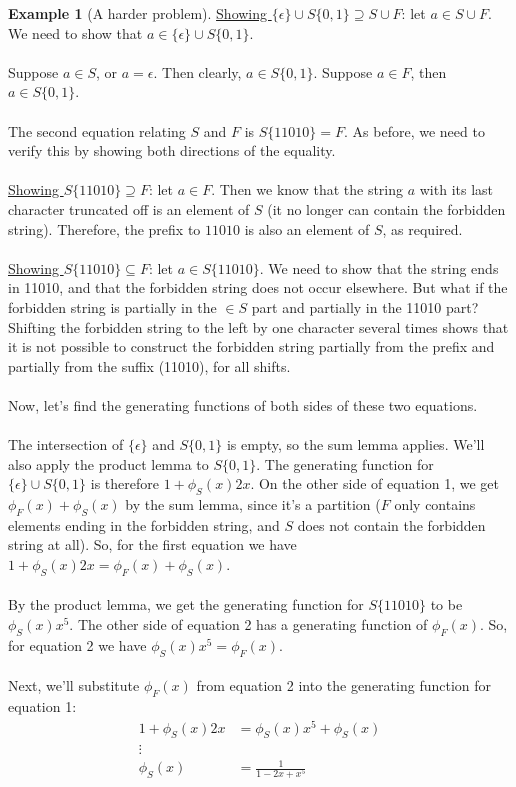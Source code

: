 \documentclass[]{article}
\theoremstyle{definition}
\newtheorem{ex}{Example}[section]
\newcommand{\lecture}[1]{\marginpar{{\footnotesize $\leftarrow$ \underline{#1}}}}
\begin{document}
\begin{ex}[A harder problem]
					\underline{Showing $\{ \epsilon \} \cup S \{ 0, 1 \} \supseteq S \cup F$}: let $a \in S \cup F$. We need to show that $a \in \{ \epsilon \} \cup S \{ 0, 1 \}$.
					\\ \\
					Suppose $a \in S$, or $a = \epsilon$. Then clearly, $a \in S \{ 0, 1 \}$. Suppose $a \in F$, then $a \in S \{ 0, 1 \}$.
					\\ \\
					The second equation relating $S$ and $F$ is $S\{11010\} = F$. As before, we need to verify this by showing both directions of the equality. \lecture{February 4, 2013} 
					\\ \\
					\underline{Showing $S\{11010\} \supseteq F$}: let $a \in F$. Then we know that the string $a$ with its last character truncated off is an element of $S$ (it no longer can contain the forbidden string). Therefore, the prefix to $11010$ is also an element of $S$, as required.
					\\ \\
					\underline{Showing $S\{11010\} \subseteq F$}: let $a \in S\{11010\}$. We need to show that the string ends in 11010, and that the forbidden string does not occur elsewhere. But what if the forbidden string is partially in the $\in S$ part and partially in the 11010 part? Shifting the forbidden string to the left by one character several times shows that it is not possible to construct the forbidden string partially from the prefix and partially from the suffix (11010), for all shifts.
					\\ \\
					Now, let's find the generating functions of both sides of these two equations.
					\\ \\
					The intersection of $\{ \epsilon \}$ and $S\{0, 1\}$ is empty, so the sum lemma applies. We'll also apply the product lemma to $S\{ 0, 1 \}$. The generating function for $\{ \epsilon \} \cup S\{0, 1\}$ is therefore $1 + \phi_S(x) 2x$. On the other side of equation 1, we get $\phi_F(x) + \phi_S(x)$ by the sum lemma, since it's a partition ($F$ only contains elements ending in the forbidden string, and $S$ does not contain the forbidden string at all). So, for the first equation we have $1 + \phi_S(x) 2x = \phi_F(x) + \phi_S(x)$.
					\\ \\
					By the product lemma, we get the generating function for $S\{11010\}$ to be $\phi_S(x) x^5$. The other side of equation 2 has a generating function of $\phi_F(x)$. So, for equation 2 we have $\phi_S(x) x^5 = \phi_F(x)$.
					\\ \\
					Next, we'll substitute $\phi_F(x)$ from equation 2 into the generating function for equation 1:
					\begin{align*}
						1 + \phi_S(x) 2x &= \phi_S(x) x^5 + \phi_S(x) \\
						\vdots& \\
						\phi_S(x) &= \frac{1}{1 - 2x + x^5}
					\end{align*}
				\end{ex}
\end{document}
